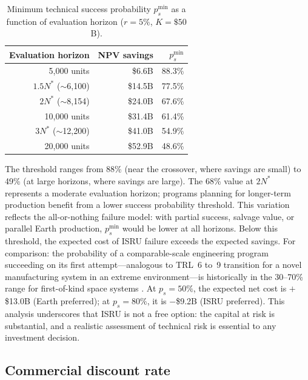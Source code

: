 \documentclass[preprint,12pt]{elsarticle}
\begin{document}
\begin{table}[htbp]
\centering
\caption{Minimum technical success probability $p_s^{\min}$ as a function of evaluation horizon ($r = 5\%$, $K = \$50$B).}
\label{tab:ps_horizon}
\small
\begin{tabular}{@{}rrr@{}}
\toprule
Evaluation horizon & NPV savings & $p_s^{\min}$ \\
\midrule
5{,}000 units            & \$6.6B   & 88.3\% \\
$1.5 N^*$ ($\sim$6{,}100) & \$14.5B  & 77.5\% \\
$2 N^*$ ($\sim$8{,}154)   & \$24.0B  & 67.6\% \\
10{,}000 units           & \$31.4B  & 61.4\% \\
$3 N^*$ ($\sim$12{,}200)  & \$41.0B  & 54.9\% \\
20{,}000 units           & \$52.9B  & 48.6\% \\
\bottomrule
\end{tabular}
\end{table}

The threshold ranges from 88\% (near the crossover, where savings are small) to 49\% (at large horizons, where savings are large). The 68\% value at $2N^*$ represents a moderate evaluation horizon; programs planning for longer-term production benefit from a lower success probability threshold. This variation reflects the all-or-nothing failure model: with partial success, salvage value, or parallel Earth production, $p_s^{\min}$ would be lower at all horizons. Below this threshold, the expected cost of ISRU failure exceeds the expected savings. For comparison: the probability of a comparable-scale engineering program succeeding on its first attempt---analogous to TRL~6 to~9 transition for a novel manufacturing system in an extreme environment---is historically in the 30--70\% range for first-of-kind space systems \cite{wertz2011}. At $p_s = 50\%$, the expected net cost is $+$\$13.0B (Earth preferred); at $p_s = 80\%$, it is $-$\$9.2B (ISRU preferred). This analysis underscores that ISRU is not a free option: the capital at risk is substantial, and a realistic assessment of technical risk is essential to any investment decision.

\subsection{Commercial discount rate}
\label{sec:commercial_rate}
\end{document}
